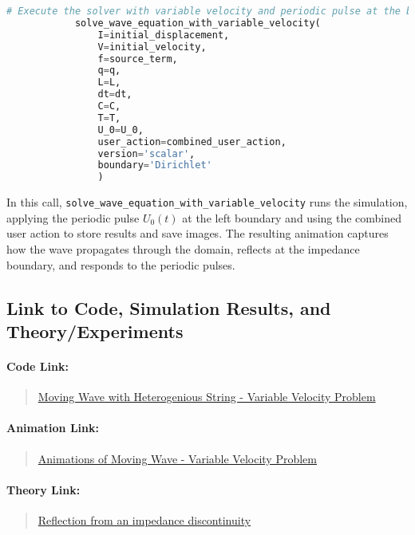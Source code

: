 \documentclass{article}
\begin{document}
		\begin{lstlisting}[language=Python]
			# Execute the solver with variable velocity and periodic pulse at the boundary
			solve_wave_equation_with_variable_velocity(
				I=initial_displacement,
				V=initial_velocity,
				f=source_term,
				q=q,
				L=L,
				dt=dt,
				C=C,
				T=T,
				U_0=U_0,
				user_action=combined_user_action,
				version='scalar',
				boundary='Dirichlet'
				)
		\end{lstlisting}
		
		In this call, \texttt{solve\_wave\_equation\_with\_variable\_velocity} runs the simulation, applying the periodic pulse \( U_0(t) \) at the left boundary and using the combined user action to store results and save images. The resulting animation captures how the wave propagates through the domain, reflects at the impedance boundary, and responds to the periodic pulses.
		
		\subsection{Link to Code, Simulation Results, and Theory/Experiments}
		
		
		\paragraph{Code Link:}
		\begin{quote}
			\href{https://github.com/pb96git/Numerical-Solutions-for-Partial-Differential-Equations/blob/main/Part_2_WaveEquation/Example_Codes/heterogenious_string_wave_simulation.py}{Moving Wave with Heterogenious String - Variable Velocity Problem}
		\end{quote}
		
		\paragraph{Animation Link:}
		\begin{quote}
			\href{https://github.com/pb96git/Numerical-Solutions-for-Partial-Differential-Equations/tree/main/Part_2_WaveEquation/Animations_postProcessing/variable_velocity}{Animations of Moving Wave - Variable Velocity Problem}
		\end{quote}
		
		\paragraph{Theory Link:}
		\begin{quote}
			\href{https://www.acs.psu.edu/drussell/demos/reflect/reflect.html}{Reflection from an impedance discontinuity}
		\end{quote}			
		

	

	
\end{document}
